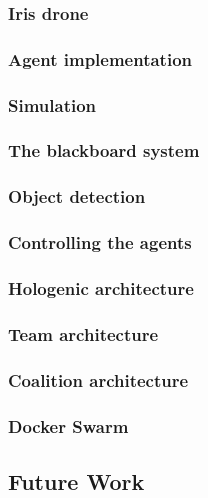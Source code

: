 \subsubsection{Iris drone}


\newpage 
\subsubsection{Agent implementation}


\newpage
\subsubsection{Simulation}


\newpage
\subsubsection{The blackboard system}


\newpage
\subsubsection{Object detection}


\newpage
\subsubsection{Controlling the agents}


\newpage
\subsubsection{Hologenic architecture}


\newpage
\subsubsection{Team architecture}



\newpage
\subsubsection{Coalition architecture}



\newpage
\subsubsection{Docker Swarm}


\newpage
\subsection{Future Work}
